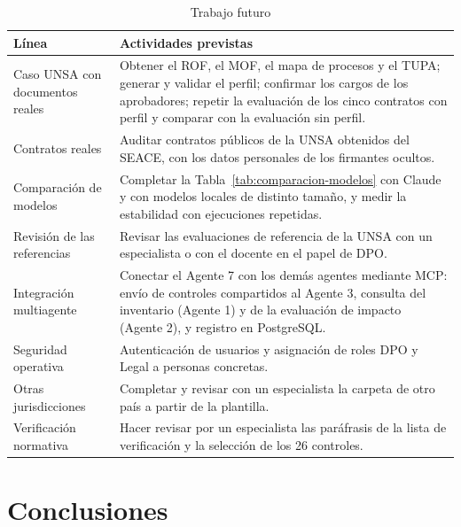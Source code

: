 \documentclass[12pt,letterpaper]{article}
\begin{document}
\begin{table}[H]
\centering
\small
\caption{Trabajo futuro}
\label{tab:futuro}
\begin{tabularx}{\linewidth}{@{}L{3.6cm} Y@{}}
\toprule
\textbf{Línea} & \textbf{Actividades previstas} \\
\midrule
Caso UNSA con documentos reales & Obtener el ROF, el MOF, el mapa de procesos y el TUPA; generar y validar el perfil; confirmar los cargos de los aprobadores; repetir la evaluación de los cinco contratos con perfil y comparar con la evaluación sin perfil. \\
Contratos reales & Auditar contratos públicos de la UNSA obtenidos del SEACE, con los datos personales de los firmantes ocultos. \\
Comparación de modelos & Completar la Tabla~\ref{tab:comparacion-modelos} con Claude y con modelos locales de distinto tamaño, y medir la estabilidad con ejecuciones repetidas. \\
Revisión de las referencias & Revisar las evaluaciones de referencia de la UNSA con un especialista o con el docente en el papel de DPO. \\
Integración multiagente & Conectar el Agente 7 con los demás agentes mediante MCP: envío de controles compartidos al Agente 3, consulta del inventario (Agente 1) y de la evaluación de impacto (Agente 2), y registro en PostgreSQL. \\
Seguridad operativa & Autenticación de usuarios y asignación de roles DPO y Legal a personas concretas. \\
Otras jurisdicciones & Completar y revisar con un especialista la carpeta de otro país a partir de la plantilla. \\
Verificación normativa & Hacer revisar por un especialista las paráfrasis de la lista de verificación y la selección de los 26 controles. \\
\bottomrule
\end{tabularx}
\end{table}

\newpage
\section{Conclusiones}
\end{document}
